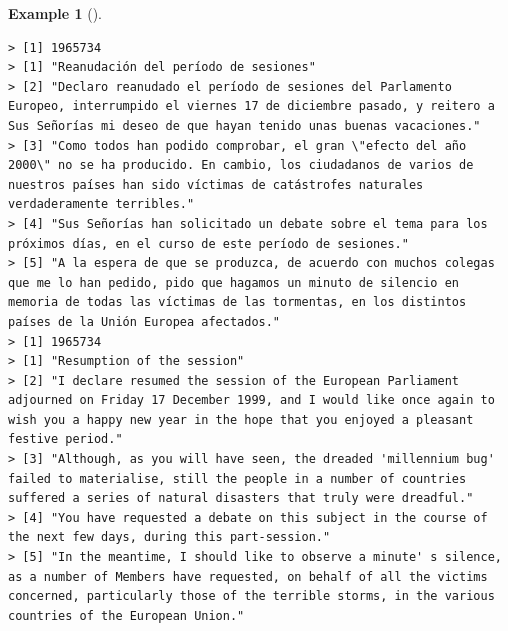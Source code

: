 \documentclass[
  letterpaper,
]{latex/krantz}
\theoremstyle{definition}
\newtheorem{example}{Example}[chapter]
\theoremstyle{remark}
\begin{document}
\begin{example}[]
\begin{verbatim}
> [1] 1965734
> [1] "Reanudación del período de sesiones"                                                                                                                                                                                                 
> [2] "Declaro reanudado el período de sesiones del Parlamento Europeo, interrumpido el viernes 17 de diciembre pasado, y reitero a Sus Señorías mi deseo de que hayan tenido unas buenas vacaciones."                                      
> [3] "Como todos han podido comprobar, el gran \"efecto del año 2000\" no se ha producido. En cambio, los ciudadanos de varios de nuestros países han sido víctimas de catástrofes naturales verdaderamente terribles."                    
> [4] "Sus Señorías han solicitado un debate sobre el tema para los próximos días, en el curso de este período de sesiones."                                                                                                                
> [5] "A la espera de que se produzca, de acuerdo con muchos colegas que me lo han pedido, pido que hagamos un minuto de silencio en memoria de todas las víctimas de las tormentas, en los distintos países de la Unión Europea afectados."
> [1] 1965734
> [1] "Resumption of the session"                                                                                                                                                                                                               
> [2] "I declare resumed the session of the European Parliament adjourned on Friday 17 December 1999, and I would like once again to wish you a happy new year in the hope that you enjoyed a pleasant festive period."                         
> [3] "Although, as you will have seen, the dreaded 'millennium bug' failed to materialise, still the people in a number of countries suffered a series of natural disasters that truly were dreadful."                                         
> [4] "You have requested a debate on this subject in the course of the next few days, during this part-session."                                                                                                                               
> [5] "In the meantime, I should like to observe a minute' s silence, as a number of Members have requested, on behalf of all the victims concerned, particularly those of the terrible storms, in the various countries of the European Union."
\end{verbatim}

\end{example}
\end{document}
